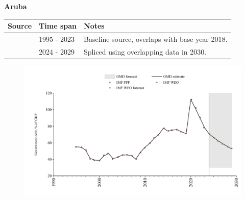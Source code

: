 \documentclass[12pt,a4paper,landscape]{article}
\begin{document}
\begin{adjustbox}{max totalsize={\paperwidth}{\paperheight},center}
\begin{minipage}[t][\textheight][t]{\textwidth}
\vspace*{0.5cm}
{}
\begin{center}
{\Large\bfseries Aruba}
\end{center}
\vspace{0.5cm}
\begin{table}[H]
\centering
\small
\begin{tabular}{|l|l|l|}
\hline
\textbf{Source} & \textbf{Time span} & \textbf{Notes} \\
\hline
\rowcolor{white}\cite{IMF_FPP}& 1995 - 2023 &Baseline source, overlaps with base year 2018.\\
\rowcolor{lightgray}\cite{IMF_WEO_forecast}& 2024 - 2029 &Spliced using overlapping data in 2030.\\
\hline
\end{tabular}
\end{table}
\begin{figure}[H]
\centering
\includegraphics[width=\textwidth,height=0.6\textheight,keepaspectratio]{graphs/ABW_govdebt_GDP.pdf}
\end{figure}
\end{minipage}
\end{adjustbox}
\end{document}
